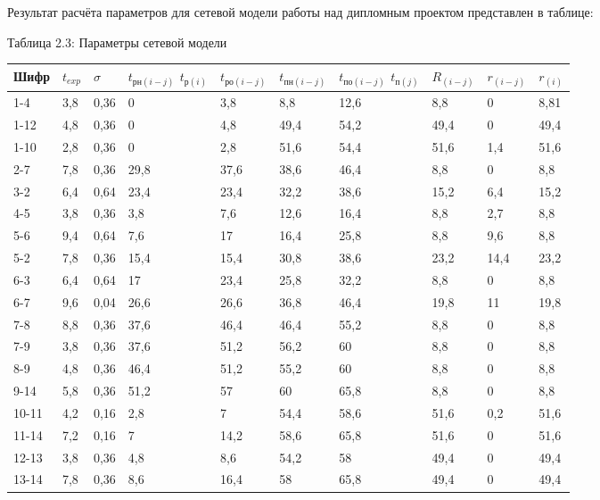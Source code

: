 Результат расчёта параметров для сетевой модели работы над дипломным проектом представлен в таблице:

\begin{center}
Таблица 2.3: Параметры сетевой модели
\end{center}
{
\footnotesize
\begin{longtable}[H]{|p{1.1cm}|p{0.5cm}|p{0.5cm}|p{1.1cm}|p{1.1cm}|p{1.1cm}|p{1.1cm}|p{0.9cm}|p{0.9cm}|p{0.9cm}|}
\hline
Шифр & $t_{exp}$ & $\sigma$ &  $t_{\mbox{рн}(i-j)}$ $t_{\mbox{р}(i)}$ & $t_{\mbox{ро}(i-j)}$ & $t_{\mbox{пн}(i-j)}$ & $t_{\mbox{по}(i-j)}$ $t_{\mbox{п}(j)}$ & $R_{(i-j)}$ & $r_{(i-j)}$ & $r_{(i)}$\\
\hline
1-4&3,8&0,36&0&3,8&8,8&12,6&8,8&0&8,81\\
\hline
1-12&4,8&0,36&0&4,8&49,4&54,2&49,4&0&49,4\\
\hline
1-10&2,8&0,36&0&2,8&51,6&54,4&51,6&1,4&51,6\\
\hline
2-7&7,8&0,36&29,8&37,6&38,6&46,4&8,8&0&8,8\\
\hline
3-2&6,4&0,64&23,4&23,4&32,2&38,6&15,2&6,4&15,2\\
\hline
4-5&3,8&0,36&3,8&7,6&12,6&16,4&8,8&2,7&8,8\\
\hline
5-6&9,4&0,64&7,6&17&16,4&25,8&8,8&9,6&8,8\\
\hline
5-2&7,8&0,36&15,4&15,4&30,8&38,6&23,2&14,4&23,2\\
\hline
6-3&6,4&0,64&17&23,4&25,8&32,2&8,8&0&8,8\\
\hline
6-7&9,6&0,04&26,6&26,6&36,8&46,4&19,8&11&19,8\\
\hline
7-8&8,8&0,36&37,6&46,4&46,4&55,2&8,8&0&8,8\\
\hline
7-9&3,8&0,36&37,6&51,2&56,2&60&8,8&0&8,8\\
\hline
8-9&4,8&0,36&46,4&51,2&55,2&60&8,8&0&8,8\\
\hline
9-14&5,8&0,36&51,2&57&60&65,8&8,8&0&8,8\\
\hline
10-11&4,2&0,16&2,8&7&54,4&58,6&51,6&0,2&51,6\\
\hline
11-14&7,2&0,16&7&14,2&58,6&65,8&51,6&0&51,6\\
\hline
12-13&3,8&0,36&4,8&8,6&54,2&58&49,4&0&49,4\\
\hline
13-14&7,8&0,36&8,6&16,4&58&65,8&49,4&0&49,4\\
\hline
\end{longtable}
}

